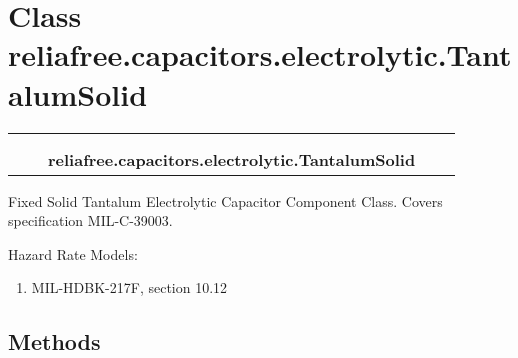 %
%
%


\section{Class reliafree.capacitors.electrolytic.TantalumSolid}

    \label{reliafree:capacitors:electrolytic:TantalumSolid}
\begin{tabular}{cccccc}
\multicolumn{2}{r}{\settowidth{\BCL}{reliafree.capacitors.capacitor.Capacitor}\multirow{2}{\BCL}{reliafree.capacitors.capacitor.Capacitor}}
&&
  \\\cline{3-3}
  &&\multicolumn{1}{c|}{}
&&
  \\
&&\multicolumn{2}{l}{\textbf{reliafree.capacitors.electrolytic.TantalumSolid}}
\end{tabular}

Fixed Solid Tantalum Electrolytic Capacitor Component Class. Covers 
specification MIL-C-39003.

Hazard Rate Models:

\begin{enumerate}

\setlength{\parskip}{0.5ex}
  \item MIL-HDBK-217F, section 10.12

\end{enumerate}



  \subsection{Methods}

